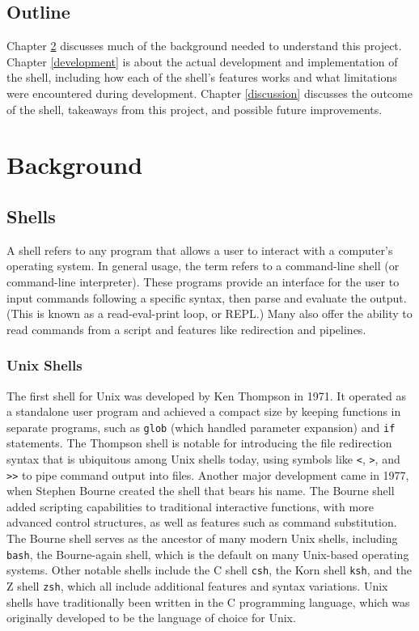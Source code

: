 \documentclass[12pt,twoside]{report} %
\begin{document}
	\section{Outline}
	Chapter \ref{background} discusses much of the background needed to understand this project. Chapter \ref{development} is about the actual development and implementation of the shell, including how each of the shell's features works and what limitations were encountered during development. Chapter \ref{discussion} discusses the outcome of the shell, takeaways from this project, and possible future improvements.

	\chapter{Background} \label{background}

	\section{Shells} \label{sec:shells}
	A shell refers to any program that allows a user to interact with a computer's operating system. In general usage, the term refers to a command-line shell (or command-line interpreter). These programs provide an interface for the user to input commands following a specific syntax, then parse and evaluate the output. (This is known as a read-eval-print loop, or REPL.) Many also offer the ability to read commands from a script and features like redirection and pipelines.

	\subsection{Unix Shells} \label{sec:unix-shells}
	The first shell for Unix was developed by Ken Thompson in 1971. It operated as a standalone user program and achieved a compact size by keeping functions in separate programs, such as \verb|glob| (which handled parameter expansion) and \verb|if| statements. The Thompson shell is notable for introducing the file redirection syntax that is ubiquitous among Unix shells today, using symbols like \verb|<|, \verb|>|, and \verb|>>| to pipe command output into files. Another major development came in 1977, when Stephen Bourne created the shell that bears his name. The Bourne shell added scripting capabilities to traditional interactive functions, with more advanced control structures, as well as features such as command substitution. The Bourne shell serves as the ancestor of many modern Unix shells, including \verb|bash|, the Bourne-again shell, which is the default on many Unix-based operating systems. Other notable shells include the C shell \verb|csh|, the Korn shell \verb|ksh|, and the Z shell \verb|zsh|, which all include additional features and syntax variations. Unix shells have traditionally been written in the C programming language, which was originally developed to be the language of choice for Unix.\cite{shells}
	
\end{document}
